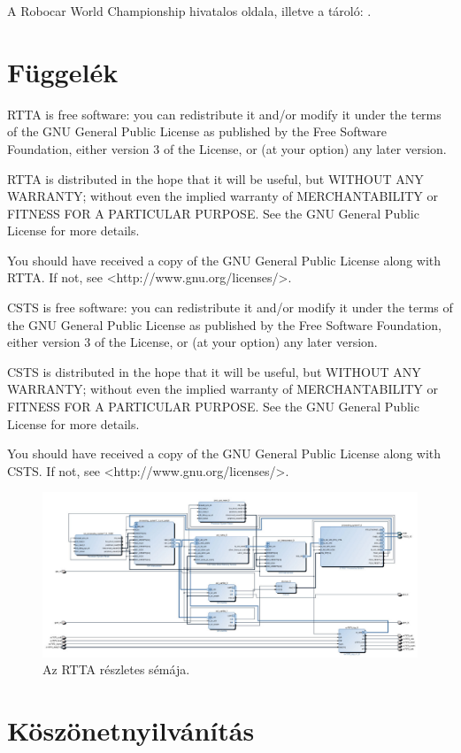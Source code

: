 \documentclass[a4paper,12pt]{report}
\begin{document}
A Robocar World Championship hivatalos oldala, illetve a tároló: \cite{oocwcrepo}.


\chapter*{Függelék}

\noindent
RTTA is free software: you can redistribute it and/or modify
it under the terms of the GNU General Public License as published by
the Free Software Foundation, either version 3 of the License, or
(at your option) any later version.

\noindent
RTTA is distributed in the hope that it will be useful,
but WITHOUT ANY WARRANTY; without even the implied warranty of
MERCHANTABILITY or FITNESS FOR A PARTICULAR PURPOSE.  See the
GNU General Public License for more details.

\noindent
You should have received a copy of the GNU General Public License
along with RTTA. If not, see <http://www.gnu.org/licenses/>.

\noindent
CSTS is free software: you can redistribute it and/or modify
it under the terms of the GNU General Public License as published by
the Free Software Foundation, either version 3 of the License, or
(at your option) any later version.

\noindent
CSTS is distributed in the hope that it will be useful,
but WITHOUT ANY WARRANTY; without even the implied warranty of
MERCHANTABILITY or FITNESS FOR A PARTICULAR PURPOSE.  See the
GNU General Public License for more details.

\noindent
You should have received a copy of the GNU General Public License
along with CSTS. If not, see <http://www.gnu.org/licenses/>.


\begin{figure}
    \centering
    \includegraphics[width=10in]{img/base_design_1}
    \caption{Az RTTA részletes sémája.}
    \label{detailedscheme}
\end{figure}

\chapter*{Köszönetnyilvánítás}
\end{document}
